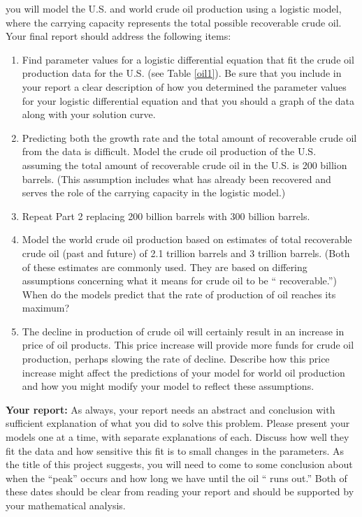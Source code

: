 \documentclass
[justified,nohyper]
{tufte-handout}
\begin{document}
 you will model the U.S. and world crude oil 
production using a logistic model, where the carrying capacity represents the 
total possible recoverable crude oil. Your final report should address the 
following items:

\begin{enumerate}
  \item Find parameter values for a logistic differential equation that fit the 
  crude oil production data for the U.S. (see Table \ref{oil1}). Be sure that you include in your report a clear 
  description of how you determined the parameter values for your logistic 
  differential equation and that you should a graph of the data along with your 
  solution curve.
  \item Predicting both the growth rate and the total amount of recoverable crude 
  oil from the data is difficult. Model the crude oil production of the U.S. 
  assuming the total amount of recoverable crude oil in the U.S. is 200 billion 
  barrels. (This assumption includes what has already been recovered and serves 
  the role of the carrying capacity in the logistic model.)
  \item Repeat Part 2 replacing 200 billion barrels with 300 billion barrels.
  \item Model the world crude oil production based on estimates of total 
  recoverable crude oil (past and future) of 2.1 trillion barrels and 3 trillion 
  barrels. (Both of these estimates are commonly used. They are based on 
  differing assumptions concerning what it means for crude oil to be ``
  recoverable.'') When do the models predict that the rate of production of oil 
  reaches its maximum?
  \item The decline in production of crude oil will certainly result in an 
  increase in price of oil products. This price increase will provide more funds 
  for crude oil production, perhaps slowing the rate of decline. Describe how 
  this price increase might affect the predictions of your model for world oil 
  production and how you might modify your model to reflect these assumptions.
\end{enumerate}

\textbf{Your report:} As always, your report needs an abstract and conclusion 
with sufficient explanation of what you did to solve this problem. Please present 
your models one at a time, with separate explanations of each. Discuss how well 
they fit the data and how sensitive this fit is to small changes in the 
parameters. As the title of this project suggests, you will need to come to some 
conclusion about when the ``peak'' occurs and how long we have until the oil ``
runs out.'' Both of these dates should be clear from reading your report and 
should be supported by your mathematical analysis. 
\end{document}
